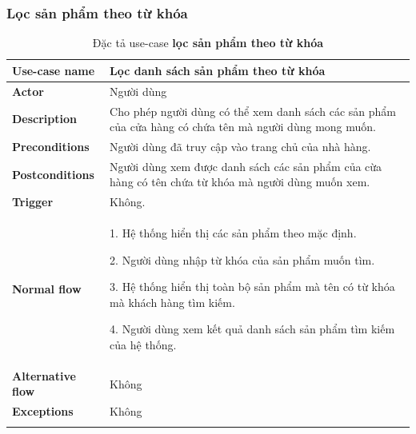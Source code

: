     \subsubsection{Lọc sản phẩm theo từ khóa} 
            \begin{center}
            
                \begin{longtable}{| p{} | p{} |} 
    \hline
    \textbf{Use-case name}
    & 
    Lọc danh sách sản phẩm theo từ khóa
    \\
    \hline
    \textbf{Actor} 
    & 
    Người dùng
    \\
    \hline
    \textbf{Description} 
    & 
    Cho phép người dùng có thể xem danh sách các sản phẩm của cửa hàng có chứa tên mà người dùng mong muốn.
    \\
    \hline
     \textbf{Preconditions} 
    &
    Người dùng đã truy cập vào trang chủ của nhà hàng.
    \\
    \hline
    \textbf{Postconditions} 
    & 
    Người dùng xem được danh sách các sản phẩm  của cừa hàng có tên chứa từ khóa mà người dùng muốn xem.
    \\
    \hline
    \textbf{Trigger} 
    & 
    Không.
    \\
    \hline
     \textbf{Normal flow}
    & 
        1. Hệ thống hiển thị các sản phẩm theo mặc định.
        
        2. Người dùng nhập từ khóa của sản phẩm muốn tìm.
        
        3. Hệ thống hiển thị toàn bộ sản phẩm mà tên có từ khóa mà khách hàng tìm kiếm.
        
        4. Người dùng xem kết quả danh sách sản phẩm tìm kiếm của hệ thống.
    \\
    \hline
    \textbf{Alternative flow}
    & 
    Không
    \\
    \hline
    \textbf{Exceptions} 
    &
    Không
    \\
    \hline
    \caption{Đặc tả use-case \textbf{lọc sản phẩm theo từ khóa}}
    \end{longtable}
    \end{center}
    
